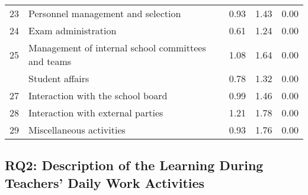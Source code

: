 \documentclass[
]{article}
\begin{document}
\begin{longtable}[t]{llccc}
23 & Personnel management and selection & 0.93 & 1.43 & 0.00\\
24 & Exam administration & 0.61 & 1.24 & 0.00\\
25 & Management of internal school committees and teams & 1.08 & 1.64 & 0.00\\
\addlinespace
26 & Student affairs & 0.78 & 1.32 & 0.00\\
27 & Interaction with the school board & 0.99 & 1.46 & 0.00\\
28 & Interaction with external parties & 1.21 & 1.78 & 0.00\\
29 & Miscellaneous activities & 0.93 & 1.76 & 0.00\\
\bottomrule
\end{longtable}
\endgroup{}

\subsection{RQ2: Description of the Learning During Teachers' Daily Work
Activities}\label{rq2-description-of-the-learning-during-teachers-daily-work-activities}
\end{document}
